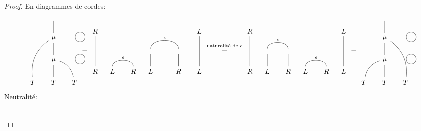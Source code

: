 \documentclass[math, info]{cours}
\begin{document}
\begin{proof}
	En diagrammes de cordes:
	\begin{equation*}
		\begin{tikzcd}[remember picture]
			&[-10pt]\phantom{}\ar[d, no head] &[-10pt]\\
			& |[alias=mu]|\mu & \\
			& |[alias=mu2]|\mu\ar[u, no head] & \\
			T\ar[uur, no head, bend left] & T\ar[u, no head] & T\ar[ul, bend right, no head]
		\end{tikzcd}
		\begin{tikzpicture}[remember picture, overlay]
			\draw (mu) circle (.25cm) {};
			\draw (mu2) circle (.25cm) {};
		\end{tikzpicture}
		 =
		 \begin{tikzcd}
			 R &[-15pt] &[-10pt] &[-15pt] & &[-10pt] L\\
			 & & & \phantom{}\ar[r, bend left=90, no head, "\epsilon"] & \phantom{} & \\
			 R\ar[uu, no head] & L\ar[r, bend left=90, no head, "\epsilon"] & R & L\ar[u, no head] & R\ar[u, no head] & L\ar[uu, no head]
		 \end{tikzcd}
		 \overset{\text{naturalité de $\epsilon$}}{=}
		 \begin{tikzcd}
			 R &[-15pt] &[-10pt] &[-15pt] &[-10pt] &[-15pt] L\\
			 & \phantom{}\ar[r, bend left=90, no head, "\epsilon"] & \phantom{} & & & \\
			 R\ar[uu, no head] & L\ar[u, no head] & R\ar[u, no head] &  L\ar[r, bend left=90, "\epsilon", no head] & R & L\ar[uu, no head]
		 \end{tikzcd}
		 =
		 \begin{tikzcd}[remember picture]
			 &[-10pt]\phantom{}\ar[d, no head] &[-10pt]\\
			& |[alias=mu]|\mu\ar[d, no head] & \\
			& |[alias=mu2]|\mu &\\
			T\ar[ur, no head, bend left] & T\ar[u, no head] & T\ar[uul, no head, bend right]
		 \end{tikzcd}
		\begin{tikzpicture}[remember picture, overlay]
			\draw (mu) circle (.25cm) {};
			\draw (mu2) circle (.25cm) {};
		\end{tikzpicture}
	\end{equation*}
	Neutralité:
	\begin{equation*}
		\begin{tikzcd}

\end{tikzcd}
\end{equation*}
\end{proof}
\end{document}
